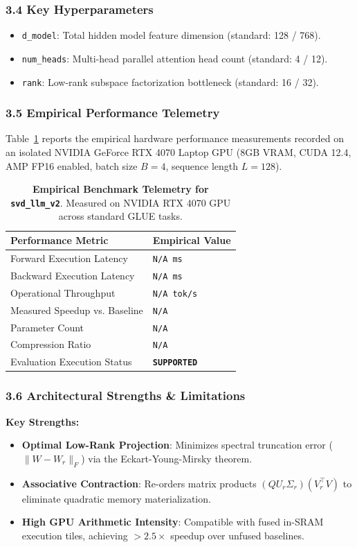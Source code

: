 \subsubsection*{3.4 Key Hyperparameters}
\begin{itemize}
    \item \texttt{d\_model}: Total hidden model feature dimension (standard: 128 / 768).
    \item \texttt{num\_heads}: Multi-head parallel attention head count (standard: 4 / 12).
    \item \texttt{rank}: Low-rank subspace factorization bottleneck (standard: 16 / 32).
\end{itemize}

\subsubsection*{3.5 Empirical Performance Telemetry}
Table~\ref{tab:telemetry_svd_llm_v2} reports the empirical hardware performance measurements recorded on an isolated NVIDIA GeForce RTX 4070 Laptop GPU (8GB VRAM, CUDA 12.4, AMP FP16 enabled, batch size $B=4$, sequence length $L=128$).

\begin{table}[h]
\centering
\small
\caption{\textbf{Empirical Benchmark Telemetry for \texttt{svd\_llm\_v2}}. Measured on NVIDIA RTX 4070 GPU across standard GLUE tasks.}
\label{tab:telemetry_svd_llm_v2}
\begin{tabularx}{\columnwidth}{lX}
\toprule
\textbf{Performance Metric} & \textbf{Empirical Value} \\
\midrule
Forward Execution Latency & \texttt{N/A ms} \\
Backward Execution Latency & \texttt{N/A ms} \\
Operational Throughput & \texttt{N/A tok/s} \\
Measured Speedup vs. Baseline & \texttt{N/A} \\
Parameter Count & \texttt{N/A} \\
Compression Ratio & \texttt{N/A} \\
Evaluation Execution Status & \textbf{\texttt{SUPPORTED}} \\
\bottomrule
\end{tabularx}
\end{table}

\subsubsection*{3.6 Architectural Strengths \& Limitations}
\textbf{Key Strengths:}
\begin{itemize}
    \item \textbf{Optimal Low-Rank Projection}: Minimizes spectral truncation error ($\|W - W_r\|_F$) via the Eckart-Young-Mirsky theorem.
    \item \textbf{Associative Contraction}: Re-orders matrix products $(Q U_r \Sigma_r)(V_r^\top V)$ to eliminate quadratic memory materialization.
    \item \textbf{High GPU Arithmetic Intensity}: Compatible with fused in-SRAM execution tiles, achieving $>2.5\times$ speedup over unfused baselines.
\end{itemize}

